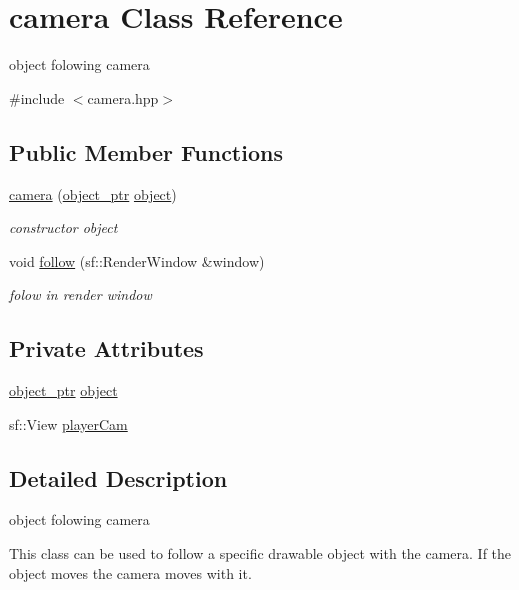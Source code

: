 \hypertarget{classcamera}{}\section{camera Class Reference}
\label{classcamera}


object folowing camera  




{\ttfamily \#include $<$camera.\+hpp$>$}

\subsection*{Public Member Functions}
\begin{DoxyCompactItemize}
\item 
\hyperlink{classcamera_ac3c67027b5f4f19c6f12db7d909930b5}{camera} (\hyperlink{drawable_8hpp_aab5add95f06d2ba25dbfed8eb07274fa}{object\+\_\+ptr} \hyperlink{classcamera_a2f634677bff4e01829c2b7023e302d5b}{object})
\begin{DoxyCompactList}\small\item\em constructor object \end{DoxyCompactList}\item 
void \hyperlink{classcamera_a1bb99501ba67453e0ca86f3c8aef5cb1}{follow} (sf\+::\+Render\+Window \&window)
\begin{DoxyCompactList}\small\item\em folow in render window \end{DoxyCompactList}\end{DoxyCompactItemize}
\subsection*{Private Attributes}
\begin{DoxyCompactItemize}
\item 
\hyperlink{drawable_8hpp_aab5add95f06d2ba25dbfed8eb07274fa}{object\+\_\+ptr} \hyperlink{classcamera_a2f634677bff4e01829c2b7023e302d5b}{object}
\item 
sf\+::\+View \hyperlink{classcamera_a1ecd39044bc4cfde95854bb5c3390440}{player\+Cam}
\end{DoxyCompactItemize}


\subsection{Detailed Description}
object folowing camera 

This class can be used to follow a specific drawable object with the camera. If the object moves the camera moves with it. 

